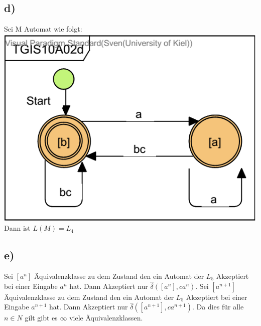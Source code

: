 \subsection*{d)}
Sei M Automat wie folgt:\\
\includegraphics[width=\textwidth]{part/TGIS10A02d}
Dann ist $L(M)= L_4 $

\subsection*{e)}
Sei $[a^n]$ Äquivalenzklasse zu dem Zustand den ein Automat der $L_5$ Akzeptiert bei einer Eingabe $a^n$ hat. Dann Akzeptiert nur $\widehat{\delta}([a^n],  c a^n) $. Sei $[a^{n+1}]$ Äquivalenzklasse zu dem Zustand den ein Automat der $L_5$ Akzeptiert bei einer Eingabe $a^{n+1}$ hat. Dann Akzeptiert nur $\widehat{\delta}([a^{n+1}],  c a^{n+1}) $. Da dies für alle $n \in N$ gilt gibt es $\infty$ viele Äquivalenzklassen.
